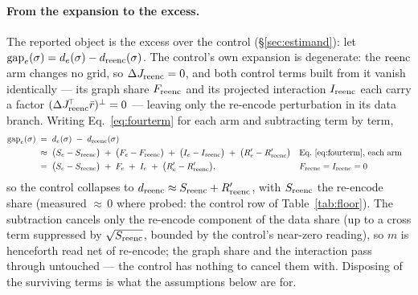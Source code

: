 \paragraph{From the expansion to the excess.}
The reported object is the excess over the control
(\S\ref{sec:estimand}): let
$\mathrm{gap}_e(\sigma) = d_e(\sigma) - d_{\mathrm{reenc}}(\sigma)$. The control's own
expansion is degenerate: the $\mathrm{reenc}$ arm changes no grid, so
$\Delta J_{\mathrm{reenc}} = 0$, and both control terms built from it vanish
identically --- its graph share $F_{\mathrm{reenc}}$ and its projected
interaction $I_{\mathrm{reenc}}$ each carry a factor
$(\Delta J_{\mathrm{reenc}}^{\!\top}\bar r)^{\perp} = 0$ --- leaving only the
re-encode perturbation in its data branch. Writing
Eq.~\ref{eq:fourterm} for each arm and subtracting term by term,
\begin{align*}
\mathrm{gap}_e(\sigma)
\;&=\; d_e(\sigma) \;-\; d_{\mathrm{reenc}}(\sigma)\\
&\approx\;
\big(S_e - S_{\mathrm{reenc}}\big) \;+\; \big(F_e - F_{\mathrm{reenc}}\big)
\;+\; \big(I_e - I_{\mathrm{reenc}}\big) \;+\; \big(R'_e - R'_{\mathrm{reenc}}\big)
&&\text{Eq.~\ref{eq:fourterm}, each arm}\\
&=\;
\big(S_e - S_{\mathrm{reenc}}\big) \;+\; F_e \;+\; I_e
\;+\; \big(R'_e - R'_{\mathrm{reenc}}\big),
&&F_{\mathrm{reenc}} = I_{\mathrm{reenc}} = 0
\end{align*}
so the control collapses to
$d_{\mathrm{reenc}} \approx S_{\mathrm{reenc}} + R'_{\mathrm{reenc}}$, with $S_{\mathrm{reenc}}$ the
re-encode share (measured ${\approx}\,0$ where probed: the control row
of Table~\ref{tab:floor}).
The subtraction cancels only the re-encode component of the data share
(up to a cross term suppressed by $\sqrt{S_{\mathrm{reenc}}}$, bounded by the
control's near-zero reading), so $m$ is henceforth read net of
re-encode; the graph share and the interaction pass through untouched
--- the control has nothing to cancel them with. Disposing of the
surviving terms is what the assumptions below are for.

